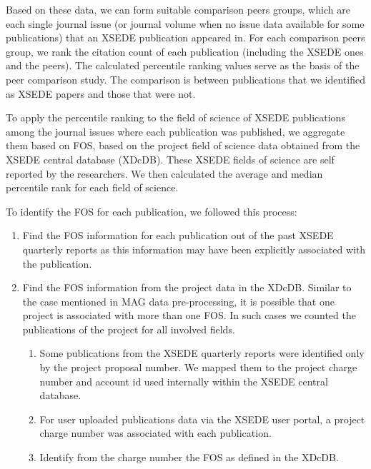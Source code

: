 \documentclass{sig-alternate}
\begin{document}
Based on these data, we can form suitable comparison peers groups,
which are each single journal issue (or journal volume when no issue
data available for some publications) that an XSEDE publication
appeared in. For each comparison peers group, we rank the citation
count of each publication (including the XSEDE ones and the
peers). The calculated percentile ranking values serve as the basis of
the peer comparison study. The comparison is between publications that
we identified as XSEDE papers and those that were not.

To apply the percentile ranking to the field of science of XSEDE
publications among the journal issues where each publication was
published, we aggregate them based on FOS, based on the project field
of science data obtained from the XSEDE central database
(XDcDB). These XSEDE fields of science are self reported by the
researchers. We then calculated the average and median percentile rank
for each field of science.

To identify the FOS for each publication, we followed this process:

\begin{enumerate}

\item Find the FOS information for each publication out of the past
  XSEDE quarterly reports as this information may have been explicitly
  associated with the publication.

\item Find the FOS information from the project data in the
  XDcDB. Similar to the case mentioned in MAG data pre-processing, it
  is possible that one project is associated with more than one
  FOS. In such cases we counted the publications of the project for
  all involved fields.

\begin{enumerate}

\item Some publications from the XSEDE quarterly reports were
  identified only by the project proposal number. We mapped them to
  the project charge number and account id used internally within the
  XSEDE central database.

\item For user uploaded publications data via the XSEDE user portal, a
  project charge number was associated with each publication.

\item Identify from the charge number the FOS as defined in the XDcDB.

\end{enumerate}

\end{enumerate}
\end{document}
